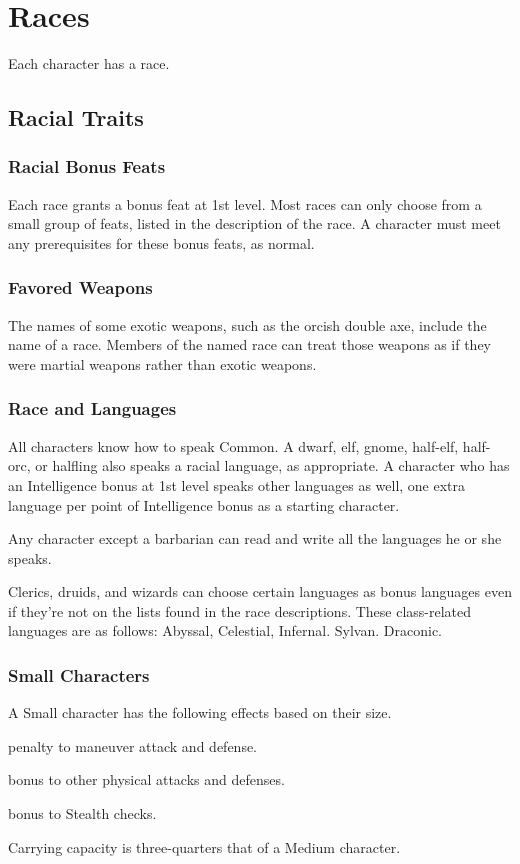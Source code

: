 \chapter{Races}

Each character has a race.

\section{Racial Traits}

\subsection{Racial Bonus Feats}
Each race grants a bonus feat at 1st level. Most races can only choose from a small group of feats, listed in the description of the race. A character must meet any prerequisites for these bonus feats, as normal.

\subsection{Favored Weapons}
The names of some exotic weapons, such as the orcish double axe, include the name of a race. Members of the named race can treat those weapons as if they were martial weapons rather than exotic weapons.

\subsection{Race and Languages}
All characters know how to speak Common. A dwarf, elf, gnome, half-elf, half-orc, or halfling also speaks a racial language, as appropriate. A character who has an Intelligence bonus at 1st level speaks other languages as well, one extra language per point of Intelligence bonus as a starting character.

 Any character except a barbarian can read and write all the languages he or she speaks.

 Clerics, druids, and wizards can choose certain languages as bonus languages even if they're not on the lists found in the race descriptions. These class-related languages are as follows:
 Abyssal, Celestial, Infernal.
 Sylvan.
 Draconic.

\subsection{Small Characters}\label{Small Characters}
A Small character has the following effects based on their size.
  \begin{itemize*} 
    \item {} penalty to maneuver attack and defense.
    \item {} bonus to other physical attacks and defenses.
    \item {} bonus to Stealth checks.
    \item Carrying capacity is three-quarters that of a Medium character.
  \end{itemize*}


